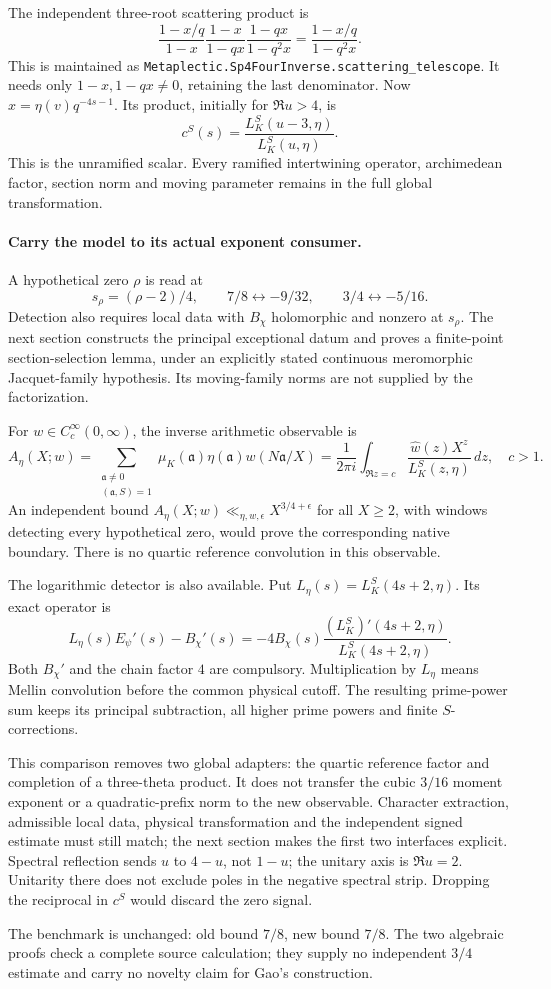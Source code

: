 The independent three-root scattering product is
\[
 \frac{1-x/q}{1-x}\frac{1-x}{1-qx}\frac{1-qx}{1-q^2x}
 =\frac{1-x/q}{1-q^2x}.
\]
This is maintained as
\texttt{Metaplectic.Sp4FourInverse.scattering\_telescope}.
It needs only \(1-x,1-qx\ne0\), retaining the last denominator.
Now \(x=\eta(v)q^{-4s-1}\). Its product, initially for \(\Re u>4\), is
\[
 c^S(s)=\frac{L_K^S(u-3,\eta)}{L_K^S(u,\eta)}.
\]
This is the unramified scalar. Every ramified intertwining operator,
archimedean factor, section norm and moving parameter remains in the
full global transformation.

\paragraph{Carry the model to its actual exponent consumer.}
A hypothetical zero \(\rho\) is read at
\[
 s_\rho=(\rho-2)/4,\qquad
 7/8\longleftrightarrow-9/32,\qquad
 3/4\longleftrightarrow-5/16.
\]
Detection also requires local data with \(B_\chi\) holomorphic and
nonzero at \(s_\rho\). The next section constructs the principal
exceptional datum and proves a finite-point section-selection lemma,
under an explicitly stated continuous meromorphic Jacquet-family
hypothesis. Its moving-family norms are not supplied by the factorization.

For \(w\in C_c^\infty(0,\infty)\), the inverse arithmetic observable is
\[
 A_\eta(X;w)=
 \sum_{\substack{\mathfrak a\ne0\\(\mathfrak a,S)=1}}
 \mu_K(\mathfrak a)\eta(\mathfrak a)w(N\mathfrak a/X)
 =\frac1{2\pi i}\int_{\Re z=c}
       \frac{\widehat w(z)X^z}{L_K^S(z,\eta)}\,dz,\quad c>1.
\]
An independent bound \(A_\eta(X;w)\ll_{\eta,w,\epsilon}
X^{3/4+\epsilon}\) for all \(X\ge2\), with windows detecting every
hypothetical zero, would prove the corresponding native boundary.
There is no quartic reference convolution in this observable.

The logarithmic detector is also available. Put
\(L_\eta(s)=L_K^S(4s+2,\eta)\). Its exact operator is
\[
 L_\eta(s)E_\psi'(s)-B_\chi'(s)
 =-4B_\chi(s)\frac{(L_K^S)'(4s+2,\eta)}{L_K^S(4s+2,\eta)}.
\]
Both \(B_\chi'\) and the chain factor \(4\) are compulsory.
Multiplication by \(L_\eta\) means Mellin convolution before the common
physical cutoff. The resulting prime-power sum keeps its principal
subtraction, all higher prime powers and finite \(S\)-corrections.

This comparison removes two global adapters: the quartic reference
factor and completion of a three-theta product. It does not transfer
the cubic \(3/16\) moment exponent or a quadratic-prefix norm to the
new observable. Character extraction, admissible local data,
physical transformation and the independent signed estimate must still
match; the next section makes the first two interfaces explicit.
Spectral reflection sends \(u\) to \(4-u\), not \(1-u\);
the unitary axis is \(\Re u=2\). Unitarity there does not exclude poles
in the negative spectral strip. Dropping the reciprocal in \(c^S\)
would discard the zero signal.

The benchmark is unchanged: old bound \(7/8\), new bound \(7/8\).
The two algebraic proofs check a complete source calculation; they
supply no independent \(3/4\) estimate and carry no novelty claim for
Gao's construction.
